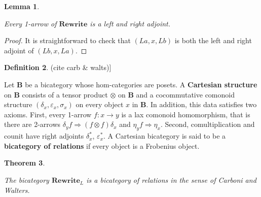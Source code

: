 \documentclass{amsart}
\renewcommand{\epsilon}{\varepsilon}
\newcommand{\defn}[1]{\textbf{#1}}
\newcommand{\cat}[1]{\mathbf{#1}}
\newcommand{\from}{\colon}
\newcommand{\Rewrite}{\mathbf{Rewrite} }
\newcommand{\edit}[1]{\textcolor{editcolour}{(#1)}}
\newtheorem{theorem}{Theorem}[section]
\newtheorem{lemma}[theorem]{Lemma}
\theoremstyle{remark}
\theoremstyle{definition}
\newtheorem{definition}[theorem]{Definition}
\begin{document}
\begin{lemma}
  \label{thm:bicat-rewr-arrows-dual}
  
  Every 1-arrow of $ \Rewrite $ is a left and right adjoint.
  
\end{lemma}

\begin{proof}
  
  It is straightforward to check that $ ( La , x , Lb ) $ is both the
  left and right adjoint of $ ( Lb , x , La ) $.
  
\end{proof}

\begin{definition}\edit{cite carb \& walts}]
  \label{def:bicat-rels}

  Let $ \cat{B} $ be a bicategory whose hom-categories are posets. A
  \defn{Cartesian structure} on $ \cat{B} $ consists of a tensor
  product $ \otimes $ on $ \cat{B} $ and a cocommutative comonoid
  structure $ (\delta_x , \epsilon_x , \sigma_x ) $ on every object
  $ x $ in $ \cat{B} $.  In addition, this data satisfies two
  axioms. First, every 1-arrow $ f \from x \to y $ is a lax comonoid
  homomorphism, that is there are 2-arrows
  $ \delta_y f \Rightarrow (f \otimes f) \delta_x $ and
  $ \eta_y f \Rightarrow \eta_x $. Second, comultiplication and counit
  have right adjoints $ \delta^\ast_x $, $ \epsilon^\ast_x $. A
  Cartesian bicategory is said to be a \defn{bicategory of relations}
  if every object is a Frobenius object.
  
 \end{definition}

\begin{theorem}
   \label{thm:bicat-rewr-bicat-rel}

   The bicategory $ \Rewrite_{L} $ is a bicategory of relations in the
   sense of Carboni and Walters.
   
\end{theorem}
\end{document}
